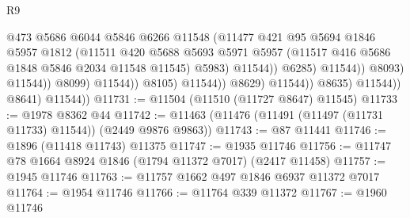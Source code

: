 \begin{lexlean}{R9}
\begin{coremodule}
                                                @473
                                                @5686
                                                @6044
                                                @5846
                                                @6266
                                                @11548
                                                (@11477
                                                  @421
                                                  @95
                                                  @5694
                                                  @1846
                                                  @5957
                                                  @1812
                                                  (@11511
                                                    @420
                                                    @5688
                                                    @5693
                                                    @5971
                                                    @5957
                                                    (@11517
                                                      @416
                                                      @5686
                                                      @1848
                                                      @5846
                                                      @2034
                                                      @11548
                                                      @11545)
                                                    @5983)
                                                  @11544))
                                              @6285)
                                            @11544))
                                        @8093)
                                      @11544))
                                  @8099)
                                @11544))
                            @8105)
                          @11544))
                      @8629)
                    @11544))
                @8635)
              @11544))
          @8641)
        @11544))
@11731 := @11504 (@11510 (@11727 @8647) @11545)
@11733 := @1978 @8362 @44
@11742 := @11463 (@11476 (@11491 (@11497 (@11731 @11733) @11544)) (@2449 @9876 @9863))
@11743 := @87 @11441
@11746 := @1896 (@11418 @11743) @11375
@11747 := @1935 @11746
@11756 := @11747 @78 @1664 @8924 @1846 (@1794 @11372 @7017) (@2417 @11458)
@11757 := @1945 @11746
@11763 := @11757 @1662 @497 @1846 @6937 @11372 @7017
@11764 := @1954 @11746
@11766 := @11764 @339 @11372
@11767 := @1960 @11746

\end{coremodule}
\end{lexlean}
